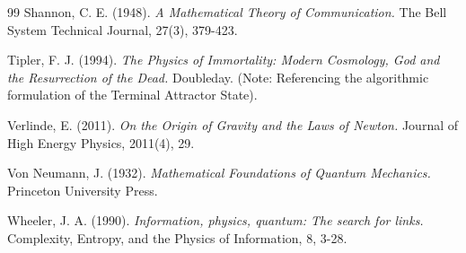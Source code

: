 \documentclass[12pt,openany]{book}
\theoremstyle{plain}
\theoremstyle{definition}
\theoremstyle{remark}
\begin{document}
\begin{thebibliography}{99}
Shannon, C. E. (1948). \textit{A Mathematical Theory of Communication.} The Bell System Technical Journal, 27(3), 379-423.

Tipler, F. J. (1994). 
\textit{The Physics of Immortality: Modern Cosmology, God and the Resurrection of the Dead.} 
Doubleday. (Note: Referencing the algorithmic formulation of the Terminal Attractor State).

Verlinde, E. (2011). \textit{On the Origin of Gravity and the Laws of Newton.} Journal of High Energy Physics, 2011(4), 29.

Von Neumann, J. (1932). \textit{Mathematical Foundations of Quantum Mechanics.} Princeton University Press.

Wheeler, J. A. (1990). \textit{Information, physics, quantum: The search for links.} Complexity, Entropy, and the Physics of Information, 8, 3-28.

\end{thebibliography}
\end{document}
